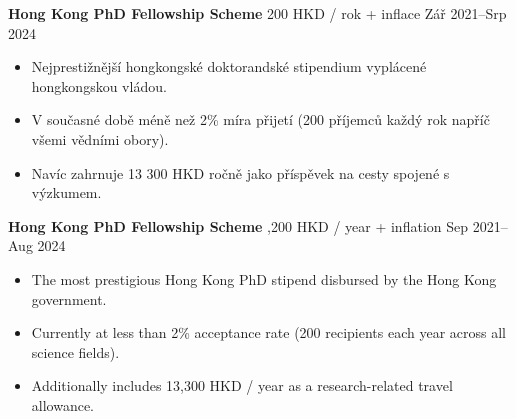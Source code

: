 \ifczech

\textbf{Hong Kong PhD Fellowship Scheme}  200 HKD / rok + inflace \hfill Zář 2021--Srp 2024
\begin{itemize}
    \item Nejprestižnější hongkongské doktorandské stipendium vyplácené hongkongskou vládou.
\item V současné době méně než 2\% míra přijetí (200 příjemců každý rok napříč všemi vědními obory).
    \item Navíc zahrnuje 13 300 HKD ročně jako příspěvek na cesty spojené s výzkumem.
\end{itemize} \par

\else 

\textbf{Hong Kong PhD Fellowship Scheme} ,200 HKD / year + inflation \hfill Sep 2021--Aug 2024
\begin{itemize}
    \item The most prestigious Hong Kong PhD stipend disbursed by the Hong Kong government.
    \item Currently at less than 2\% acceptance rate (200 recipients each year across all science fields).
    \item Additionally includes 13,300 HKD / year as a research-related travel allowance.
\end{itemize}

\fi